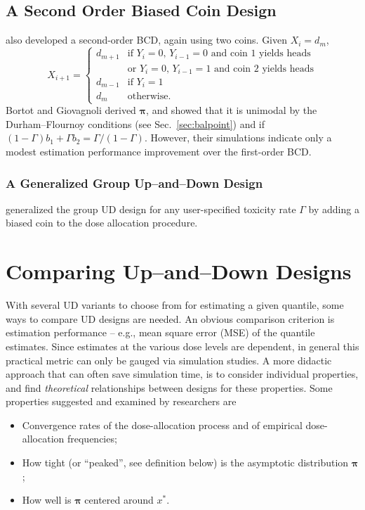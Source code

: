 \section{A Second Order Biased Coin Design}
\cite{Bort:Giov:Upan:2005} also developed a second-order BCD, again using two coins. Given $X_i=d_m$,
%
\begin{equation*}
X_{i+1}=
\begin{cases}
d_{m+1} &\textrm{if $Y_i=0$, $Y_{i-1}=0$ and coin 1 yields heads}\\
        &\textrm{or $Y_i=0$, $Y_{i-1}=1$ and coin 2 yields heads}\\
d_{m-1} &\textrm{if $Y_i=1$}\\
d_m &\textrm{otherwise.}
\end{cases}
\end{equation*}
%
Bortot and Giovagnoli derived $\boldsymbol{\pi}$, and showed that it is unimodal by the Durham--Flournoy conditions (see Sec.~\ref{sec:balpoint}) and if $(1-\Gamma )b_1+\Gamma b_2=\Gamma /(1-\Gamma )$. However, their simulations indicate only a modest estimation performance improvement over the first-order BCD.

\subsection{A Generalized Group Up--and--Down Design}
\cite{Bald:Bort:Giov:2008} generalized the group UD design for any user-specified toxicity rate $\Gamma$ by adding a biased coin to the dose allocation procedure.
\chapter{Comparing Up--and--Down Designs}

With several UD variants to choose from for estimating a given quantile, some ways to compare UD designs are needed. An obvious comparison criterion is estimation performance -- e.g., mean square error (MSE) of the quantile estimates. Since estimates at the various dose levels are dependent, in general this practical metric can only be gauged via simulation studies. A more didactic approach that can often save simulation time, is to consider individual properties, and find \emph{theoretical} relationships between designs for these properties. Some properties suggested and examined by researchers are
%
\begin{itemize}
\item Convergence rates of the dose-allocation process and of empirical dose-allocation frequencies;
\item How tight (or ``peaked'', see definition below) is the asymptotic distribution $\boldsymbol{\pi}$;
\item How well is $\boldsymbol{\pi}$ centered around $x^*$.
\end{itemize}

